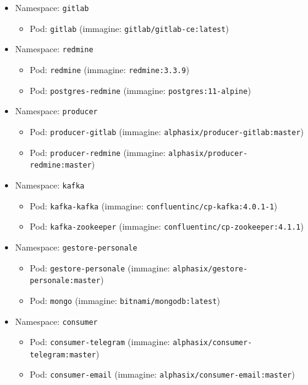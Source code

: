 \begin{itemize}
	\item Namespace: \texttt{gitlab}
	\begin{itemize}
		\item Pod: \texttt{gitlab} (immagine: \texttt{gitlab/gitlab-ce:latest})
	\end{itemize}
	
	\item Namespace: \texttt{redmine}
	\begin{itemize}
		\item Pod: \texttt{redmine} (immagine: \texttt{redmine:3.3.9})
		\item Pod: \texttt{postgres-redmine} (immagine: \texttt{postgres:11-alpine})
	\end{itemize}
	
	\item Namespace: \texttt{producer}
	\begin{itemize}
		\item Pod: \texttt{producer-gitlab} (immagine: \texttt{alphasix/producer-gitlab:master})
		\item Pod: \texttt{producer-redmine} (immagine: \texttt{alphasix/producer-redmine:master})
	\end{itemize}
	
	\item Namespace: \texttt{kafka}
	\begin{itemize}
		\item Pod: \texttt{kafka-kafka} (immagine: \texttt{confluentinc/cp-kafka:4.0.1-1})
		\item Pod: \texttt{kafka-zookeeper} (immagine: \texttt{confluentinc/cp-zookeeper:4.1.1})
	\end{itemize}
	
	\item Namespace: \texttt{gestore-personale}
	\begin{itemize}
		\item Pod: \texttt{gestore-personale} (immagine: \texttt{alphasix/gestore-personale:master})
		\item Pod: \texttt{mongo} (immagine: \texttt{bitnami/mongodb:latest})
	\end{itemize}
	
	\item Namespace: \texttt{consumer}
	\begin{itemize}
		\item Pod: \texttt{consumer-telegram} (immagine: \texttt{alphasix/consumer-telegram:master})
		\item Pod: \texttt{consumer-email} (immagine: \texttt{alphasix/consumer-email:master})
	\end{itemize}
\end{itemize}

